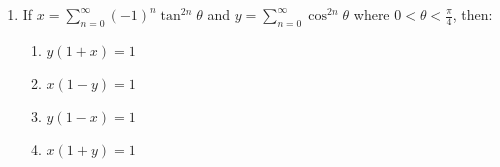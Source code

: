 \documentclass[journal]{IEEEtran}
\begin{document}
\begin{enumerate}
    \item If        
    $ x = \sum_{n=0}^{\infty} (-1)^{n} \tan^{2n} \theta $  
    and
    $ y = \sum_{n=0}^{\infty} \cos^{2n} \theta $
    where $ 0 < \theta < \frac{\pi}{4} $, then:
    \begin{enumerate}
        \item $ y(1+x) = 1 $
        \item $ x(1-y) = 1 $
        \item $ y(1-x) = 1 $
        \item $ x(1+y) = 1 $
    \end{enumerate}

\end{enumerate}
\end{document}
